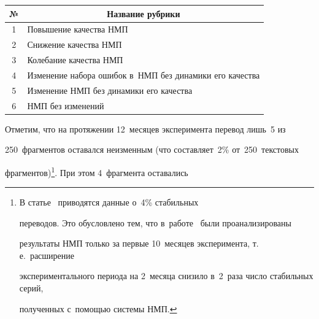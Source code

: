   \begin{table}\small %


  \begin{center}




  \vspace*{2ex}


  


  \tabcolsep=16pt


  \begin{tabular}{|c|l|}


  \hline


  


№ &\multicolumn{1}{c|}{Название рубрики}\\


\hline


1&Повышение качества НМП\\


2&Снижение качества НМП\\


3&Колебание качества НМП\\


4&Изменение набора ошибок в~НМП без динамики его качества\\


5&Изменение НМП без динамики его качества\\


6&НМП без изменений\\


\hline


\end{tabular}


\end{center}


\end{table}


  


  Отметим, что на протяжении 12~месяцев эксперимента перевод лишь~5 из 


250~фрагментов оставался неизменным (что составляет~2\% от~250~текстовых 


фрагментов)\footnote{В статье~\cite{3-eg} приводятся данные о~4\% стабильных 


переводов. Это обусловлено тем, что в~работе~\cite{3-eg} были проанализированы 


результаты НМП только за первые 10~месяцев эксперимента, т.\,е.\ расширение 


экспериментального периода на 2~месяца снизило в~2~раза число стабильных серий, 


полученных с~по\-мощью сис\-те\-мы НМП.}. При этом 4~фрагмента оставались 


